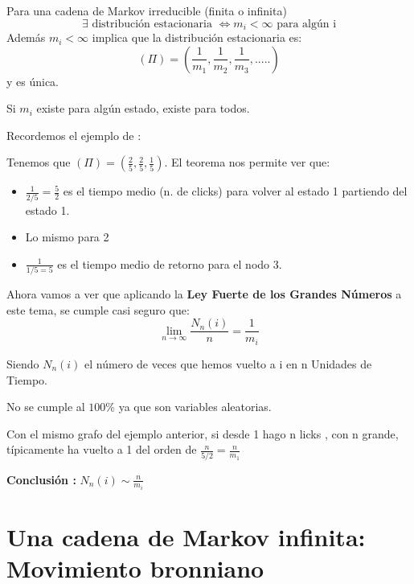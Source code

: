 	\begin{theorem}[Teorema 4]
		\label{Markov_tma4}
		Para una cadena de Markov irreducible (finita o infinita)
		$$\exists \text{ distribución estacionaria } \iff m_i <\infty \text{ para algún i}$$
		Además $m_i<\infty$ implica que la distribución estacionaria es:
		$$(\Pi) = (\frac{1}{m_1}, \frac{1}{m_2},\frac{1}{m_3}, .....)$$
		y es única.
	\end{theorem}
	\obs Si $m_i$ existe para algún estado, existe para todos.

	\begin{example}
		Recordemos el ejemplo de :
			\begin{center}
				\centering
			\end{center}

		Tenemos que $(\Pi) = (\frac{2}{5}, \frac{2}{5}, \frac{1}{5})$. El teorema nos permite ver que:
		\begin{itemize}
			\item $\frac{1}{2/5} = \frac{5}{2}$ es el tiempo medio (n. de clicks) para volver al estado 1 partiendo del estado 1.
			\item Lo mismo para 2
			\item $\frac{1}{1/5 = 5}$ es el tiempo medio de retorno para el nodo 3.
		\end{itemize}
	\end{example}

	Ahora vamos a ver que aplicando la \textbf{Ley Fuerte de los Grandes Números} a este tema, se cumple casi seguro que:
	$$\lim_{n \rightarrow \infty} \frac{N_n (i)}{n} = \frac{1}{m_i}$$

	Siendo $N_n (i)$ el número de veces que hemos vuelto a i en n Unidades de Tiempo.

	\obs No se cumple al $100\%$ ya que son variables aleatorias.

	\begin{example}
		Con el mismo grafo del ejemplo anterior, si desde 1 hago n licks , con n grande, típicamente ha vuelto a 1 del orden de $\frac{n}{5/2} = \frac{n}{m_1}$
	\end{example}

	\textbf{Conclusión :} $N_n (i) \sim \frac{n}{m_i}$




\section{Una cadena de Markov infinita: Movimiento bronniano}

